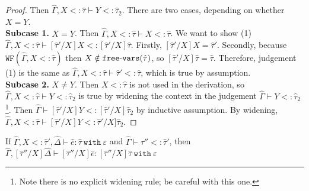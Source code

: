 \documentclass{llncs}
\newcommand{\keywadj}[1]{\mathtt{#1}}
\newcommand{\keyw}[1]{\keywadj{#1}~}
\newcommand{\kw}[1]{\keyw{ #1 }}
\newcommand{\kwa}[1]{\keywadj{ #1 }}
\newcommand{\hyphen}{\hbox{-}}
\newcommand{\wf}[1]{ \kwa{WF}(#1) }
\newcommand{\fv}[1]{ \kwa{free \hyphen vars}(#1) }
\begin{document}
\begin{proof}
 Then $\hat \Gamma, X <: \hat \tau \vdash Y <: \hat \tau_2$. There are two cases, depending on whether $X = Y$.\\

\textbf{Subcase 1.} $X = Y$. Then $\hat \Gamma, X <: \hat \tau \vdash X <: \hat \tau$. We want to show (1) $\hat \Gamma, X <: \hat \tau \vdash [\hat \tau'/X]X <: [\hat \tau'/X]\hat \tau$. Firstly, $[\hat \tau'/X]X = \hat \tau'$. Secondly, because $\wf{\hat \Gamma, X <: \hat \tau}$ then $X \notin \fv{\hat \tau}$, so $[\hat \tau'/X]\hat \tau = \hat \tau$. Therefore, judgement (1) is the same as $\hat \Gamma, X <: \hat \tau \vdash \hat \tau' <: \hat \tau$, which is true by assumption. \\

\textbf{Subcase 2.} $X \neq Y$. Then $X <: \hat \tau$ is not used in the derivation, so $\hat \Gamma, X <: \hat \tau \vdash Y <: \hat \tau_2$ is true by widening the context in the judgement $\hat \Gamma \vdash Y <: \hat \tau_2$\footnote{Note there is no explicit widening rule; be careful with this one.}. Then $\hat \Gamma \vdash [\hat \tau'/X]Y <: [\hat \tau'/X]\hat \tau_2$ by inductive assumption. By widening, $\hat \Gamma, X <: \hat \tau \vdash [\hat \tau'/X]Y <: \hat \tau'/X]\hat \tau_2$.


\end{proof}


\hrulefill

\begin{lemma}
If $\hat \Gamma, X <: \hat \tau', \hat \Delta \vdash \hat e: \hat \tau~\kw{with} \varepsilon$ and $\hat \Gamma \vdash \hat \tau'' <: \hat \tau'$, then $\hat \Gamma, [\hat \tau''/X]\hat \Delta \vdash [\hat \tau''/X]\hat e: [\hat \tau''/X]\hat \tau~\kw{with} \varepsilon$
\end{lemma}
\end{document}
